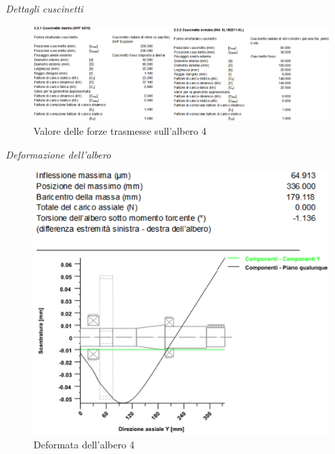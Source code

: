 \emph{Dettagli cuscinetti}
\begin{figure}[h]
    \centering
    \includegraphics[scale=0.5]{Immagini/ForzeCuscinettiAlbero4.png}
    \caption{Valore delle forze trasmesse sull'albero 4}
    \label{fig:ForzeCusinettiAlbero4}
\end{figure}
\newpage
\emph{Deformazione dell'albero}
\begin{figure}[h]
    \centering
    \includegraphics[scale=0.45]{Immagini/DeformataAlbero4.png}
    \caption{Deformata dell'albero 4}
    \label{fig:Deformataalbero4}
\end{figure}

